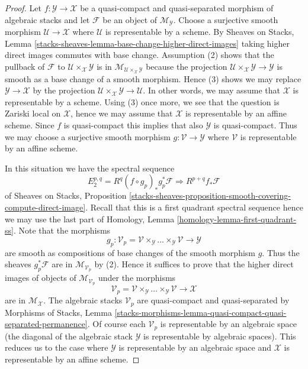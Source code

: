 \documentclass[10pt,a4paper]{amsart}
\theoremstyle{plain}
\theoremstyle{definition}
\theoremstyle{remark}
\numberwithin{equation}{subsection}
\begin{document}
\begin{proof}
Let $f : \mathcal{Y} \to \mathcal{X}$ be a quasi-compact and quasi-separated
morphism of algebraic stacks and let $\mathcal{F}$ be an object of
$\mathcal{M}_\mathcal{Y}$. Choose a surjective smooth morphism
$\mathcal{U} \to \mathcal{X}$ where $\mathcal{U}$ is representable by
a scheme. By
Sheaves on Stacks, Lemma
\ref{stacks-sheaves-lemma-base-change-higher-direct-images}
taking higher direct images commutes with base change.
Assumption (2) shows that the pullback of $\mathcal{F}$
to $\mathcal{U} \times_\mathcal{X} \mathcal{Y}$ is in
$\mathcal{M}_{\mathcal{U} \times_\mathcal{X} \mathcal{Y}}$
because the projection
$\mathcal{U} \times_\mathcal{X} \mathcal{Y} \to \mathcal{Y}$
is smooth as a base change of a smooth morphism. Hence (3) shows we may
replace $\mathcal{Y} \to \mathcal{X}$ by the projection
$\mathcal{U} \times_\mathcal{X} \mathcal{Y} \to \mathcal{U}$.
In other words, we may assume that $\mathcal{X}$
is representable by a scheme.
Using (3) once more, we see that the question is Zariski local on
$\mathcal{X}$, hence we may assume that $\mathcal{X}$ is representable by
an affine scheme. Since $f$ is quasi-compact this implies that also
$\mathcal{Y}$ is quasi-compact. Thus we may choose a surjective smooth
morphism $g : \mathcal{V} \to \mathcal{Y}$ where $\mathcal{V}$ is representable
by an affine scheme.

\medskip\noindent
In this situation we have the spectral sequence
$$
E_2^{p, q} = R^q(f \circ g_p)_*g_p^*\mathcal{F}
\Rightarrow
R^{p + q}f_*\mathcal{F}
$$
of
Sheaves on Stacks, Proposition
\ref{stacks-sheaves-proposition-smooth-covering-compute-direct-image}.
Recall that this is a first quadrant spectral sequence hence we may
use the last part of Homology, Lemma \ref{homology-lemma-first-quadrant-ss}.
Note that the morphisms
$$
g_p : \mathcal{V}_p =
\mathcal{V} \times_\mathcal{Y} \ldots \times_\mathcal{Y} \mathcal{V}
\longrightarrow
\mathcal{Y}
$$
are smooth as compositions of base changes of the smooth morphism $g$.
Thus the sheaves $g_p^*\mathcal{F}$ are in
$\mathcal{M}_{\mathcal{V}_p}$ by (2). Hence it suffices to prove that the
higher direct images of objects of $\mathcal{M}_{\mathcal{V}_p}$ under
the morphisms
$$
\mathcal{V}_p =
\mathcal{V} \times_\mathcal{Y} \ldots \times_\mathcal{Y} \mathcal{V}
\longrightarrow
\mathcal{X}
$$
are in $\mathcal{M}_\mathcal{X}$. The algebraic stacks $\mathcal{V}_p$
are quasi-compact and quasi-separated by
Morphisms of Stacks, Lemma
\ref{stacks-morphisms-lemma-quasi-compact-quasi-separated-permanence}.
Of course each $\mathcal{V}_p$ is representable by an algebraic space
(the diagonal of the algebraic stack $\mathcal{Y}$ is representable
by algebraic spaces). This reduces us to the case where
$\mathcal{Y}$ is representable by an algebraic space and $\mathcal{X}$
is representable by an affine scheme.


\end{proof}
\end{document}
